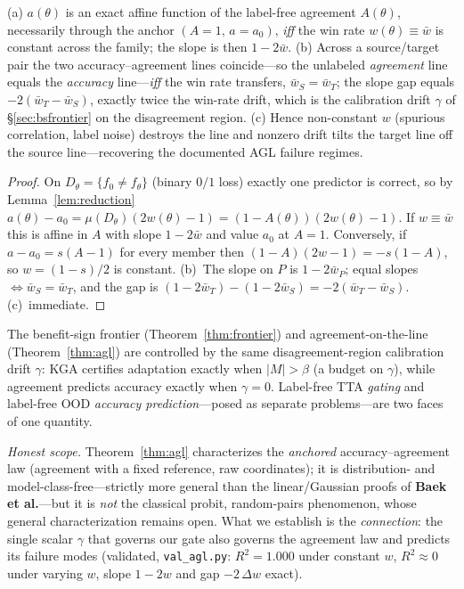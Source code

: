 \begin{theorem}\label{thm:agl}
\textnormal{(a)} $a(\theta)$ is an exact affine function of the label-free agreement
$A(\theta)$, necessarily through the anchor $(A{=}1,\,a{=}a_0)$, \emph{iff} the win rate
$w(\theta)\equiv\bar w$ is constant across the family; the slope is then $1-2\bar w$.
\textnormal{(b)} Across a source/target pair the two accuracy--agreement lines coincide---so
the unlabeled \emph{agreement} line equals the \emph{accuracy} line---\emph{iff} the win rate
transfers, $\bar w_S=\bar w_T$; the slope gap equals $-2(\bar w_T-\bar w_S)$, exactly twice
the win-rate drift, which is the calibration drift $\gamma$ of \S\ref{sec:bsfrontier} on the
disagreement region.
\textnormal{(c)} Hence non-constant $w$ (spurious correlation, label noise) destroys the line
and nonzero drift tilts the target line off the source line---recovering the documented AGL
failure regimes.
\end{theorem}
\begin{proof}
On $D_\theta=\{f_0\neq f_\theta\}$ (binary $0/1$ loss) exactly one predictor is correct, so by
Lemma~\ref{lem:reduction} $a(\theta)-a_0=\mu(D_\theta)(2w(\theta)-1)=(1-A(\theta))(2w(\theta)-1)$.
If $w\equiv\bar w$ this is affine in $A$ with slope $1-2\bar w$ and value $a_0$ at $A=1$.
Conversely, if $a-a_0=s(A-1)$ for every member then $(1-A)(2w-1)=-s(1-A)$, so $w=(1-s)/2$ is
constant. (b)~The slope on $P$ is $1-2\bar w_P$; equal slopes $\iff\bar w_S=\bar w_T$, and the
gap is $(1-2\bar w_T)-(1-2\bar w_S)=-2(\bar w_T-\bar w_S)$. (c)~immediate.
\end{proof}

\begin{corollary}\label{cor:unify-agl}
The benefit-sign frontier (Theorem~\ref{thm:frontier}) and agreement-on-the-line
(Theorem~\ref{thm:agl}) are controlled by the same disagreement-region calibration drift
$\gamma$: \textsc{KGA} certifies adaptation exactly when $|M|>\beta$ (a budget on $\gamma$),
while agreement predicts accuracy exactly when $\gamma=0$. Label-free TTA \emph{gating} and
label-free OOD \emph{accuracy prediction}---posed as separate problems---are two faces of one
quantity.
\end{corollary}

\noindent\emph{Honest scope.} Theorem~\ref{thm:agl} characterizes the \emph{anchored}
accuracy--agreement law (agreement with a fixed reference, raw coordinates); it is
distribution- and model-class-free---strictly more general than the linear/Gaussian proofs of
\textbf{Baek et al.}---but it is \emph{not} the classical probit, random-pairs phenomenon,
whose general characterization remains open. What we establish is the \emph{connection}: the
single scalar $\gamma$ that governs our gate also governs the agreement law and predicts its
failure modes (validated, \texttt{val\_agl.py}: $R^2{=}1.000$ under constant $w$,
$R^2{\approx}0$ under varying $w$, slope $1-2w$ and gap $-2\,\Delta w$ exact).

